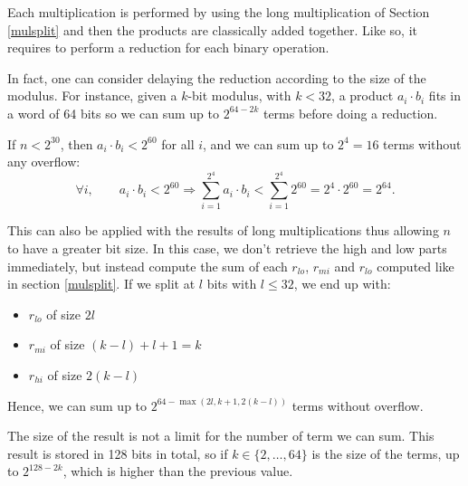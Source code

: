 \documentclass[a4paper]{article}
\begin{document}
Each multiplication is performed by using the long multiplication of Section \ref{mulsplit} and then
the products are classically added together.
Like so, it requires to perform a reduction for each binary operation.

\bigskip
In fact, one can consider delaying the reduction according to the size of the modulus.
For instance, given a $k$-bit modulus, with $k < 32$, a product $a_i\cdot b_i$ fits in a word of 64 bits so
we can sum up to $2^{64 - 2k}$ terms before doing a reduction.

\begin{example}
    If $n < 2^{30}$, then $a_i\cdot b_i < 2^{60}$ for all $i$, and we can sum up to $2^4 = 16$ terms without any overflow:
    \[
    \forall i, \qquad a_i\cdot b_i < 2^{60}  
    \Longrightarrow \sum_{i=1}^{2^4} a_i\cdot b_i < \sum_{i=1}^{2^4} 2^{60} = 2^4 \cdot 2^{60} = 2^{64}.
    \]
\end{example}

\bigskip
This can also be applied with the results of long multiplications thus allowing $n$ to have a greater bit size.
In this case, we don't retrieve the high and low parts immediately, but instead
compute the sum of each $r_{lo}$, $r_{mi}$ and $r_{lo}$ computed like in section
\ref{mulsplit}. If we split at $l$ bits with $l \leq 32$, we end up with:
\begin{itemize}
    \item $r_{lo}$ of size $2 l$
    \item $r_{mi}$ of size $(k - l) + l + 1 = k$
    \item $r_{hi}$ of size $2 \left(k - l\right)$
\end{itemize}

Hence, we can sum up to
$2^{64 - \max\left(2 l, k + 1, 2 \left(k - l\right)\right)}$ terms without
overflow.


\begin{remark}
    The size of the result is not a limit for the number of term we can sum.
    This result is stored in 128 bits in total, so if $k \in \{2, \dots, 64\}$ is
    the size of the terms, up to $2^{128 - 2k}$, which is higher than the
    previous value.
\end{remark}
\end{document}
